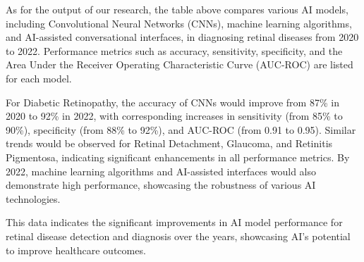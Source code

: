 \documentclass[a4paper, 12pt]{article}
\begin{document}
As for the output of our research, the table above compares various AI models, including Convolutional Neural Networks (CNNs), machine learning algorithms, and AI-assisted conversational interfaces, in diagnosing retinal diseases from 2020 to 2022. Performance metrics such as accuracy, sensitivity, specificity, and the Area Under the Receiver Operating Characteristic Curve (AUC-ROC) are listed for each model.

For Diabetic Retinopathy, the accuracy of CNNs would improve from 87\% in 2020 to 92\% in 2022, with corresponding increases in sensitivity (from 85\% to 90\%), specificity (from 88\% to 92\%), and AUC-ROC (from 0.91 to 0.95). Similar trends would be observed for Retinal Detachment, Glaucoma, and Retinitis Pigmentosa, indicating significant enhancements in all performance metrics. By 2022, machine learning algorithms and AI-assisted interfaces would also demonstrate high performance, showcasing the robustness of various AI technologies.

This data indicates the significant improvements in AI model performance for retinal disease detection and diagnosis over the years, showcasing AI's potential to improve healthcare outcomes.
\pagebreak

\nocite{Georgieva2022}
\nocite{Hassani2023}


{}   
\end{document}
